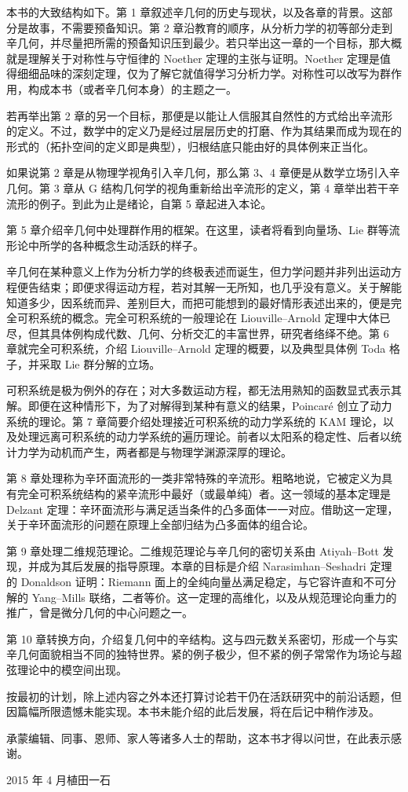本书的大致结构如下。第 1 章叙述辛几何的历史与现状，以及各章的背景。这部分是故事，不需要预备知识。第 2 章沿教育的顺序，从分析力学的初等部分走到辛几何，并尽量把所需的预备知识压到最少。若只举出这一章的一个目标，那大概就是理解关于对称性与守恒律的 Noether 定理的主张与证明。Noether 定理是值得细细品味的深刻定理，仅为了解它就值得学习分析力学。对称性可以改写为群作用，构成本书（或者辛几何本身）的主题之一。

若再举出第 2 章的另一个目标，那便是以能让人信服其自然性的方式给出辛流形的定义。不过，数学中的定义乃是经过层层历史的打磨、作为其结果而成为现在的形式的（拓扑空间的定义即是典型），归根结底只能由好的具体例来正当化。

如果说第 2 章是从物理学视角引入辛几何，那么第 3、4 章便是从数学立场引入辛几何。第 3 章从 G 结构几何学的视角重新给出辛流形的定义，第 4 章举出若干辛流形的例子。到此为止是绪论，自第 5 章起进入本论。

第 5 章介绍辛几何中处理群作用的框架。在这里，读者将看到向量场、Lie 群等流形论中所学的各种概念生动活跃的样子。

辛几何在某种意义上作为分析力学的终极表述而诞生，但力学问题并非列出运动方程便告结束；即便求得运动方程，若对其解一无所知，也几乎没有意义。关于解能知道多少，因系统而异、差别巨大，而把可能想到的最好情形表述出来的，便是完全可积系统的概念。完全可积系统的一般理论在 Liouville–Arnold 定理中大体已尽，但其具体例构成代数、几何、分析交汇的丰富世界，研究者络绎不绝。第 6 章就完全可积系统，介绍 Liouville–Arnold 定理的概要，以及典型具体例 Toda 格子，并采取 Lie 群分解的立场。

可积系统是极为例外的存在；对大多数运动方程，都无法用熟知的函数显式表示其解。即便在这种情形下，为了对解得到某种有意义的结果，Poincaré 创立了动力系统的理论。第 7 章简要介绍处理接近可积系统的动力学系统的 KAM 理论，以及处理远离可积系统的动力学系统的遍历理论。前者以太阳系的稳定性、后者以统计力学为动机而产生，两者都是与物理学渊源深厚的理论。

第 8 章处理称为辛环面流形的一类非常特殊的辛流形。粗略地说，它被定义为具有完全可积系统结构的紧辛流形中最好（或最单纯）者。这一领域的基本定理是 Delzant 定理：辛环面流形与满足适当条件的凸多面体一一对应。借助这一定理，关于辛环面流形的问题在原理上全部归结为凸多面体的组合论。

第 9 章处理二维规范理论。二维规范理论与辛几何的密切关系由 Atiyah–Bott 发现，并成为其后发展的指导原理。本章的目标是介绍 Narasimhan–Seshadri 定理的 Donaldson 证明：Riemann 面上的全纯向量丛满足稳定，与它容许直和不可分解的 Yang–Mills 联络，二者等价。这一定理的高维化，以及从规范理论向重力的推广，曾是微分几何的中心问题之一。

第 10 章转换方向，介绍复几何中的辛结构。这与四元数关系密切，形成一个与实辛几何面貌相当不同的独特世界。紧的例子极少，但不紧的例子常常作为场论与超弦理论中的模空间出现。

按最初的计划，除上述内容之外本还打算讨论若干仍在活跃研究中的前沿话题，但因篇幅所限遗憾未能实现。本书未能介绍的此后发展，将在后记中稍作涉及。

承蒙编辑、同事、恩师、家人等诸多人士的帮助，这本书才得以问世，在此表示感谢。

\vspace{1em}
\noindent\hfill 2015 年 4 月\qquad 植田一石\hspace{2em}
